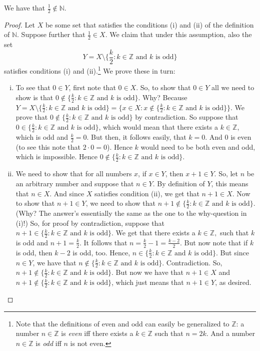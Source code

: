 \begin{enumerate}[{\thesection}.1]
		\begin{proposition}
		We have that $\frac{1}{2}\notin \mathbb{N}$.
		\end{proposition} 
		\begin{proof}
          Let $X$ be some set that satisfies the conditions (i) and (ii) of the definition of $\mathbb{N}$. Suppose further that $\frac{1}{2}\in X$. We claim that under this assumption, also the set \[Y=X\setminus \{\frac{k}{2}: k\in \mathbb{Z}\text{ and }k\text{ is odd}\}\] satisfies conditions (i) and (ii).\footnote{%
            Note that the definitions of even and odd can easily be generalized to $\mathbb{Z}$: a number $n\in\mathbb{Z}$ is \emph{even} iff there exists a $k\in\mathbb{Z}$ such that $n=2k$.
            And a number $n\in\mathbb{Z}$ is \emph{odd} iff $n$ is not even.}
          We prove these in turn:
		\begin{enumerate}[(i)]
	
		\item To see that $0\in Y$, first note that $0\in X$. So, to show that $0\in Y$ all we need to show is that $0\notin \{\frac{k}{2}: k\in \mathbb{Z}\text{ and }k\text{ is odd}\}$. Why? Because $Y=X\setminus  \{\frac{k}{2}: k\in \mathbb{Z}\text{ and }k\text{ is odd}\}=\{x\in X: x\notin  \{\frac{k}{2}: k\in \mathbb{Z}\text{ and }k\text{ is odd}\}\}$. We prove that $0\notin \{\frac{k}{2}: k\in \mathbb{Z}\text{ and }k\text{ is odd}\}$ by contradiction. So suppose that $0\in \{\frac{k}{2}: k\in \mathbb{Z}\text{ and }k\text{ is odd}\}$, which would mean that there exists a $k\in\mathbb{Z}$, which is odd and $\frac{k}{2}=0$. But then, it follows easily, that $k=0$. And $0$ is even (to see this note that $2\cdot 0=0$). Hence $k$ would need to be both even and odd, which is impossible. Hence $0\notin \{\frac{k}{2}: k\in \mathbb{Z}\text{ and }k\text{ is odd}\}$.
		
		\item We need to show that for all numbers $x$, if $x\in Y$, then $x+1\in Y$. So, let $n$ be an arbitrary number and suppose that $n\in Y$. By definition of $Y$, this means that $n\in X$. And since $X$ satisfies condition (ii), we get that $n+1\in X$. Now to show that $n+1\in Y$, we need to show that $n+1\notin   \{\frac{k}{2}: k\in \mathbb{Z}\text{ and }k\text{ is odd}\}$. (Why? The answer's essentially the same as the one to the why-question in (i)!) So, for proof by contradiction, suppose that $n+1\in \{\frac{k}{2}: k\in \mathbb{Z}\text{ and }k\text{ is odd}\}$. We get that there exists a $k\in \mathbb{Z},$ such that $k$ is odd and $n+1=\frac{k}{2}$.  It follows that $n=\frac{k}{2}-1=\frac{k-2}{2}$. But now note that if $k$ is odd, then $k-2$ is odd, too.  Hence, $n\in   \{\frac{k}{2}: k\in \mathbb{Z}\text{ and }k\text{ is odd}\}$.  But since $n\in Y$, we have that $n\notin   \{\frac{k}{2}: k\in \mathbb{Z}\text{ and }k\text{ is odd}\}$. Contradiction. So, $n+1\notin  \{\frac{k}{2}: k\in \mathbb{Z}\text{ and }k\text{ is odd}\}$. But now we have that $n+1\in X$ and $n+1\notin  \{\frac{k}{2}: k\in \mathbb{Z}\text{ and }k\text{ is odd}\}$, which just means that $n+1\in Y$, as desired.
		

\end{enumerate}
\end{proof}
\end{enumerate}
